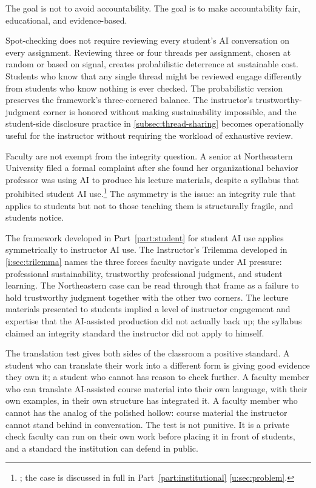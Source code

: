 \documentclass{SIAMbook2023}
\begin{document}
The goal is not to avoid accountability. The goal is to make accountability fair, educational, and evidence-based.

Spot-checking does not require reviewing every student's AI conversation on every assignment. Reviewing three or four threads per assignment, chosen at random or based on signal, creates probabilistic deterrence at sustainable cost. Students who know that any single thread might be reviewed engage differently from students who know nothing is ever checked. The probabilistic version preserves the framework's three-cornered balance. The instructor's trustworthy-judgment corner is honored without making sustainability impossible, and the student-side disclosure practice in \cref{subsec:thread-sharing} becomes operationally useful for the instructor without requiring the workload of exhaustive review.

Faculty are not exempt from the integrity question. A senior at Northeastern University filed a formal complaint after she found her organizational behavior professor was using AI to produce his lecture materials, despite a syllabus that prohibited student AI use.\footnote{\citet{hill2025professors}; the case is discussed in full in Part~\ref{part:institutional} \cref{u:sec:problem}.} The asymmetry is the issue: an integrity rule that applies to students but not to those teaching them is structurally fragile, and students notice.

The framework developed in Part~\ref{part:student} for student AI use applies symmetrically to instructor AI use. The Instructor's Trilemma developed in \cref{i:sec:trilemma} names the three forces faculty navigate under AI pressure: professional sustainability, trustworthy professional judgment, and student learning. The Northeastern case can be read through that frame as a failure to hold trustworthy judgment together with the other two corners. The lecture materials presented to students implied a level of instructor engagement and expertise that the AI-assisted production did not actually back up; the syllabus claimed an integrity standard the instructor did not apply to himself.

The translation test gives both sides of the classroom a positive standard. A student who can translate their work into a different form is giving good evidence they own it; a student who cannot has reason to check further. A faculty member who can translate AI-assisted course material into their own language, with their own examples, in their own structure has integrated it. A faculty member who cannot has the analog of the polished hollow: course material the instructor cannot stand behind in conversation. The test is not punitive. It is a private check faculty can run on their own work before placing it in front of students, and a standard the institution can defend in public.
\end{document}
